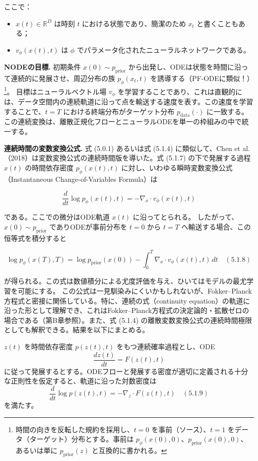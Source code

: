 ここで：

\begin{itemize}
\item $x(t) \in \mathbb{R}^D$ は時刻 $t$ における状態であり、簡潔のため $x_t$ と書くこともある；
\item $v_\phi(x(t), t)$ は $\phi$ でパラメータ化されたニューラルネットワークである。
\end{itemize}


\textbf{NODEの目標.} 初期条件 $x(0) \sim p_{\mathrm{prior}}$ から出発し、ODEは状態を時間に沿って連続的に発展させ、周辺分布の族 $p_\phi(x_t, t)$ を誘導する（PF-ODEに類似！）\footnote{時間の向きを反転した規約を採用し、$t=0$ を事前（ソース）、$t=1$ をデータ（ターゲット）分布とする。事前は $p_\phi(x(0), 0)$、$p_{\mathrm{prior}}(x(0), 0)$、あるいは単に $p_{\mathrm{prior}}(z)$ と互換的に書かれる。}。
目標はニューラルベクトル場 $v_\phi$ を学習することであり、これは直観的には、データ空間内の連続軌道に沿って点を輸送する速度を表す。この速度を学習することで、$t = T$ における終端分布がターゲット分布 $p_{\mathrm{data}}(\cdot)$ に一致する。この連続変換は、離散正規化フローとニューラルODEを単一の枠組みの中で統一する。

\textbf{連続時間の変数変換公式.} 式 (5.0.1) あるいは式 (5.1.4) に類似して、Chen et al.（2018）は変数変換公式の連続時間版を導いた。式 (5.1.7) の下で発展する過程 $x(t)$ の時間依存密度 $p_\phi(x(t), t)$ に対し、いわゆる瞬時変数変換公式（Instantaneous Change-of-Variables Formula）は

\[
\frac{d}{dt}\log p_\phi(x(t), t) = -\nabla_x \cdot v_\phi(x(t), t)
\]


である。ここでの微分はODE軌道 $x(t)$ に沿ってとられる。
したがって、$x(0) \sim p_{\mathrm{prior}}$ でありODEが事前分布を $t=0$ から $t=T$ へ輸送する場合、この恒等式を積分すると

\[
\log p_\phi(x(T), T) = \log p_{\mathrm{prior}}(x(0)) - \int_0^T \nabla_x \cdot v_\phi(x(t), t)\, dt \quad (5.1.8)
\]


が得られる。この式は数値積分による尤度評価を与え、ひいてはモデルの最尤学習を可能にする。
この公式は一見馴染みにくいかもしれないが、Fokker–Planck方程式と密接に関係している。特に、連続の式（continuity equation）の軌道に沿った形として理解でき、これはFokker–Planck方程式の決定論的・拡散ゼロの場合である（第B章参照）。また、式 (5.1.4) の離散変数変換公式の連続時間極限としても解釈できる。結果を以下にまとめる。

\begin{propositionbox}[補題 5.1.1（瞬時変数変換）]
$z(t)$ を時間依存密度 $p(z(t), t)$ をもつ連続確率過程とし、ODE
\[
\frac{dz(t)}{dt} = F(z(t), t)
\]
に従って発展するとする。ODEフローと発展する密度が適切に定義される十分な正則性を仮定すると、軌道に沿った対数密度は
\[
\frac{d}{dt}\log p(z(t), t) = -\nabla_z \cdot F(z(t), t) \quad (5.1.9)
\]
を満たす。
\end{propositionbox}


